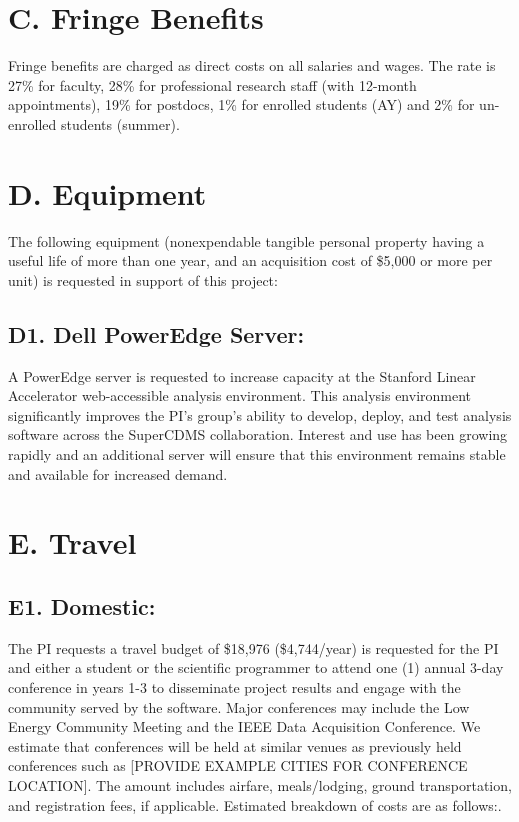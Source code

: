 \documentclass[11pt,oneside]{memoir}
\begin{document}

\section*{C. Fringe Benefits} 

Fringe benefits are charged as direct costs on all salaries and wages. The rate is 27\% for faculty, 28\% for professional research staff (with 12-month appointments), 19\% for postdocs, 1\% for enrolled students (AY) and 2\% for un-enrolled students (summer).

\section*{D. Equipment}
The following equipment (nonexpendable tangible personal property having a useful life of more than one year, and an acquisition cost of \$5,000 or more per unit) is requested in support of this project:

\subsection{D1. Dell PowerEdge Server:}  A PowerEdge server is requested to increase capacity at the Stanford Linear Accelerator web-accessible analysis environment.  This analysis environment significantly improves the PI's group's ability to develop, deploy, and test analysis software across the SuperCDMS collaboration.  Interest and use has been growing rapidly and an additional server will ensure that this environment remains stable and available for increased demand.


\section*{E. Travel}

\subsection{E1. Domestic:}
The PI requests a travel budget of \$18,976 (\$4,744/year) is requested for the PI and either a student or the scientific programmer to attend one (1) annual 3-day conference in years 1-3 to disseminate project results and engage with the community served by the software. Major conferences may include the Low Energy Community Meeting and the IEEE Data Acquisition Conference. We estimate that conferences will be held at similar venues as previously held conferences such as [PROVIDE EXAMPLE CITIES FOR CONFERENCE LOCATION]. The amount includes airfare, meals/lodging, ground transportation, and registration fees, if applicable. Estimated breakdown of costs are as follows:.
\end{document}
